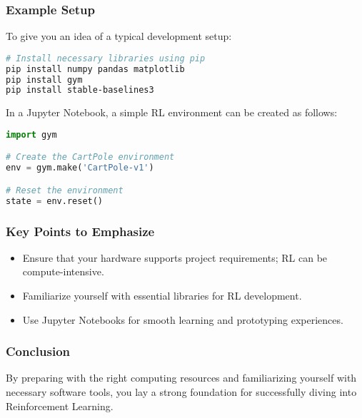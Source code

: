 \documentclass[aspectratio=169]{beamer}
\begin{document}
\begin{frame}[fragile]
    \frametitle{Example Setup}
    To give you an idea of a typical development setup:
    \begin{lstlisting}[language=bash]
# Install necessary libraries using pip
pip install numpy pandas matplotlib
pip install gym
pip install stable-baselines3
    \end{lstlisting}
    
    In a Jupyter Notebook, a simple RL environment can be created as follows:
    \begin{lstlisting}[language=python]
import gym

# Create the CartPole environment
env = gym.make('CartPole-v1')

# Reset the environment
state = env.reset()
    \end{lstlisting}
\end{frame}

\begin{frame}
    \frametitle{Key Points to Emphasize}
    \begin{itemize}
        \item Ensure that your hardware supports project requirements; RL can be compute-intensive.
        \item Familiarize yourself with essential libraries for RL development.
        \item Use Jupyter Notebooks for smooth learning and prototyping experiences.
    \end{itemize}
\end{frame}

\begin{frame}
    \frametitle{Conclusion}
    By preparing with the right computing resources and familiarizing yourself with necessary software tools, you lay a strong foundation for successfully diving into Reinforcement Learning.
\end{frame}
\end{document}
